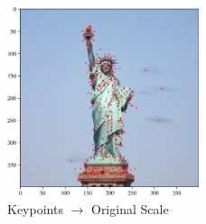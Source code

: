 \documentclass[11pt,a4paper]{article}
\begin{document}
\begin{figure}[ht!]
  \centering
  \includegraphics[width=0.5\textwidth]{figs/scaled_keypoints.png}
  \caption{Keypoints $\rightarrow$ Original Scale}
\end{figure}

\newpage
\end{document}
